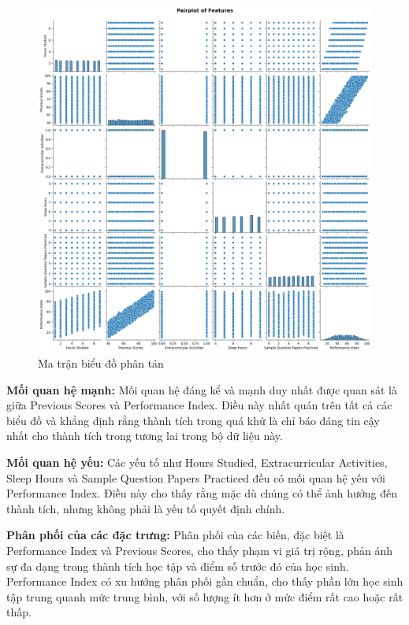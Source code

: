 \begin{figure}[H]
	\centering
	\includegraphics[width=\textwidth]{images/eda/10.png}
	\caption{Ma trận biểu đồ phân tán}
\end{figure}

\textbf{Mối quan hệ mạnh:} Mối quan hệ đáng kể và mạnh duy nhất được quan sát là giữa Previous Scores và Performance Index. Điều này nhất quán trên tất cả các biểu đồ và khẳng định rằng thành tích trong quá khứ là chỉ báo đáng tin cậy nhất cho thành tích trong tương lai trong bộ dữ liệu này.

\textbf{Mối quan hệ yếu:} Các yếu tố như Hours Studied, Extracurricular Activities, Sleep Hours và Sample Question Papers Practiced đều có mối quan hệ yếu với Performance Index. Điều này cho thấy rằng mặc dù chúng có thể ảnh hưởng đến thành tích, nhưng không phải là yếu tố quyết định chính.

\textbf{Phân phối của các đặc trưng: } Phân phối của các biến, đặc biệt là Performance Index và Previous Scores, cho thấy phạm vi giá trị rộng, phản ánh sự đa dạng trong thành tích học tập và điểm số trước đó của học sinh. Performance Index có xu hướng phân phối gần chuẩn, cho thấy phần lớn học sinh tập trung quanh mức trung bình, với số lượng ít hơn ở mức điểm rất cao hoặc rất thấp.


